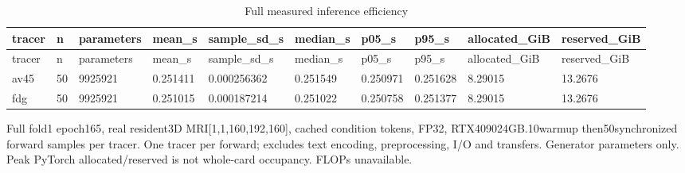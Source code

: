 \begin{landscape}
\begingroup
\footnotesize
\setlength{\tabcolsep}{4pt}
\begin{longtable}{llllllllll}
\caption{Full measured inference efficiency}\label{tab:s-n21}\\
\toprule
tracer & n & parameters & mean\_s & sample\_sd\_s & median\_s & p05\_s & p95\_s & allocated\_GiB & reserved\_GiB \\
\midrule
\endfirsthead
\toprule
tracer & n & parameters & mean\_s & sample\_sd\_s & median\_s & p05\_s & p95\_s & allocated\_GiB & reserved\_GiB \\
\midrule
\endhead
\bottomrule
\endfoot
av45 & 50 & 9925921 & 0.251411 & 0.000256362 & 0.251549 & 0.250971 & 0.251628 & 8.29015 & 13.2676 \\
fdg & 50 & 9925921 & 0.251015 & 0.000187214 & 0.251022 & 0.250758 & 0.251377 & 8.29015 & 13.2676 \\
\end{longtable}
\noindent\parbox{\linewidth}{\footnotesize Full fold1 epoch165, real resident3D MRI[1,1,160,192,160], cached condition tokens, FP32, RTX409024GB.10warmup then50synchronized forward samples per tracer. One tracer per forward; excludes text encoding, preprocessing, I/O and transfers. Generator parameters only. Peak PyTorch allocated/reserved is not whole-card occupancy. FLOPs unavailable.}
\endgroup
\end{landscape}
